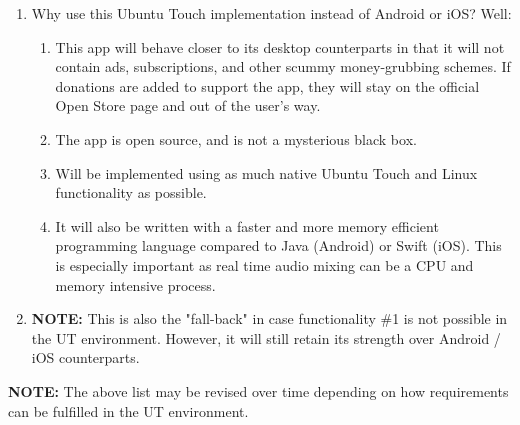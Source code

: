\begin{enumerate}
\begin{enumerate}
		\item Why use this Ubuntu Touch implementation instead of Android or iOS? Well:
		\begin{enumerate}
			\item This app will behave closer to its desktop counterparts in that it will not contain ads, subscriptions, and other scummy money-grubbing schemes. If donations are added to support the app, they will stay on the official Open Store page and out of the user's way.
			\item The app is open source, and is not a mysterious black box.
			\item Will be implemented using as much native Ubuntu Touch and Linux functionality as possible.
			\item It will also be written with a faster and more memory efficient programming language compared to Java (Android) or Swift (iOS). This is especially important as real time audio mixing can be a CPU and memory intensive process.
		\end{enumerate}
		
		\item \textbf{NOTE: } This is also the "fall-back" in case functionality \#1 is not possible in the UT environment. However, it will still retain its strength over Android / iOS counterparts.
	\end{enumerate}
\end{enumerate}


\textbf{NOTE:} The above list may be revised over time depending on how requirements can be fulfilled in the UT environment.
